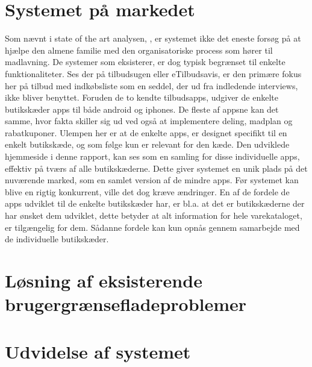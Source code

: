 \section{Systemet på markedet}
Som nævnt i state of the art analysen, , er systemet ikke det eneste forsøg på at hjælpe den almene familie med den organisatoriske process som hører til madlavning.
De systemer som eksisterer, er dog typisk begrænset til enkelte funktionaliteter.
Ses der på tilbudsugen eller eTilbudsavis, er den primære fokus her på tilbud med indkøbsliste som en seddel, der ud fra indledende interviews, ikke bliver benyttet.
Foruden de to kendte tilbudsapps, udgiver de enkelte butikskæder apps til både android og iphones.
De fleste af appsne kan det samme, hvor fakta skiller sig ud ved også at implementere deling, madplan og rabatkuponer.
Ulempen her er at de enkelte apps, er designet specifikt til en enkelt butikskæde, og som følge kun er relevant for den kæde.
Den udviklede hjemmeside i denne rapport, kan ses som en samling for disse individuelle apps, effektiv på tværs af alle butikskæderne.
Dette giver systemet en unik plads på det nuværende marked, som en samlet version af de mindre apps.
Før systemet kan blive en rigtig konkurrent, ville det dog kræve ændringer.
En af de fordele de apps udviklet til de enkelte butikskæder har, er bl.a. at det er butikskæderne der har ønsket dem udviklet, dette betyder at alt information for hele varekataloget, er tilgængelig for dem.
Sådanne fordele kan kun opnås gennem samarbejde med de individuelle butikskæder.

\section{Løsning af eksisterende brugergrænsefladeproblemer}

\section{Udvidelse af systemet}
